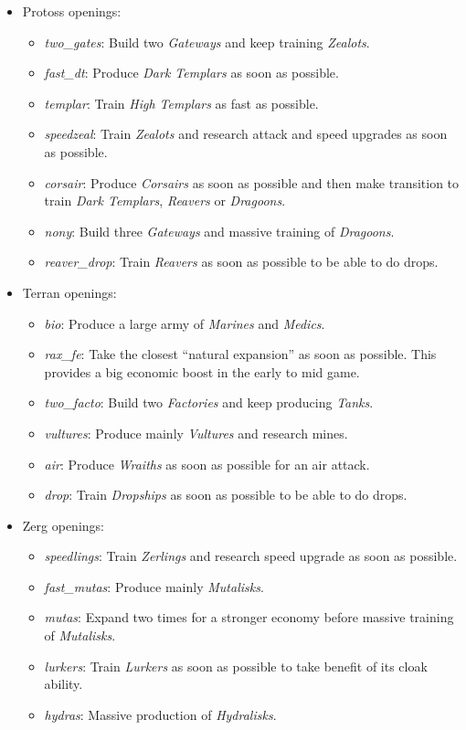 \documentclass[journal]{IEEEtran}
\begin{document}
\begin{itemize}
  \item Protoss openings:
  \begin{itemize}
    \item \emph{two\_gates}: Build two \emph{Gateways} and keep training \emph{Zealots}.
    \item \emph{fast\_dt}: Produce \emph{Dark Templars} as soon as possible.
    \item \emph{templar}: Train \emph{High Templars} as fast as possible.
    \item \emph{speedzeal}: Train \emph{Zealots}  and research attack and speed upgrades as soon as possible.
    \item \emph{corsair}: Produce \emph{Corsairs} as soon as possible and then make transition to train \emph{Dark Templars}, \emph{Reavers} or \emph{Dragoons}.
    \item \emph{nony}: Build three \emph{Gateways} and massive training of \emph{Dragoons}.
    \item \emph{reaver\_drop}: Train \emph{Reavers} as soon as possible to be able to do drops.
  \end{itemize}
  \item Terran openings:
  \begin{itemize}
    \item \emph{bio}: Produce a large army of \emph{Marines} and \emph{Medics}.
    \item \emph{rax\_fe}: Take the closest ``natural expansion'' as soon as possible. This provides a big economic boost in the early to mid game.
    \item \emph{two\_facto}: Build two \emph{Factories} and keep producing \emph{Tanks}.
    \item \emph{vultures}: Produce mainly \emph{Vultures} and research mines.
    \item \emph{air}: Produce \emph{Wraiths} as soon as possible for an air attack.
    \item \emph{drop}: Train \emph{Dropships} as soon as possible to be able to do drops. 
  \end{itemize}
  \item Zerg openings:
  \begin{itemize}
    \item \emph{speedlings}: Train \emph{Zerlings} and research speed upgrade as soon as possible.
    \item \emph{fast\_mutas}: Produce mainly \emph{Mutalisks}.
    \item \emph{mutas}: Expand two times for a stronger economy before massive training of \emph{Mutalisks}.
    \item \emph{lurkers}: Train \emph{Lurkers} as soon as possible to take benefit of its cloak ability.
    \item \emph{hydras}: Massive production of \emph{Hydralisks}.
  \end{itemize}
\end{itemize}
\end{document}
